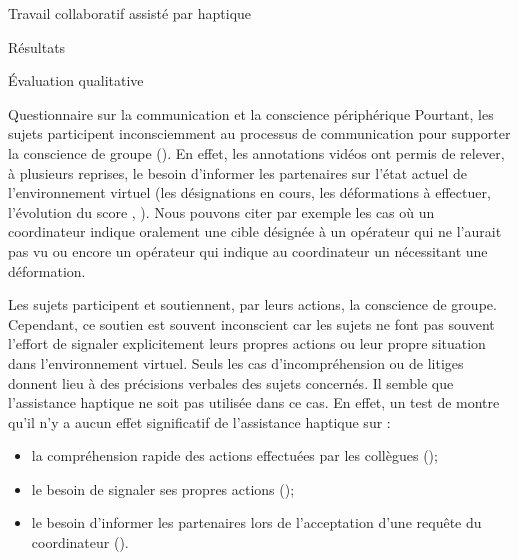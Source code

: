 \documentclass[myfrancais,ngerman,english,french]{mythesis}
\begin{document}
\begin{mychapter}{Travail collaboratif assisté par haptique}
\begin{mysection}{Résultats}
\begin{mysubsection}{Évaluation qualitative}
\begin{mysubsubsection}{Questionnaire sur la communication et la conscience périphérique}
					Pourtant, les sujets participent inconsciemment au processus de communication pour supporter la conscience de groupe ().
					En effet, les annotations vidéos ont permis de relever, à plusieurs reprises, le besoin d'informer les partenaires sur l'état actuel de l'environnement virtuel (les désignations en cours, les déformations à effectuer, l'évolution du score , \myetc).
					Nous pouvons citer par exemple les cas où un coordinateur indique oralement une cible désignée à un opérateur qui ne l'aurait pas vu ou encore un opérateur qui indique au coordinateur un  nécessitant une déformation.

					Les sujets participent et soutiennent, par leurs actions, la conscience de groupe.
					Cependant, ce soutien est souvent inconscient car les sujets ne font pas souvent l'effort de signaler explicitement leurs propres actions ou leur propre situation dans l'environnement virtuel.
					Seuls les cas d'incompréhension ou de litiges donnent lieu à des précisions verbales des sujets concernés.
					Il semble que l'assistance haptique ne soit pas utilisée dans ce cas.
					En effet, un test de  montre qu'il n'y a aucun effet significatif de l'assistance haptique  sur :
					\begin{itemize}
						\item la compréhension rapide des actions effectuées par les collègues ();
						\item le besoin de signaler ses propres actions ();
						\item le besoin d'informer les partenaires lors de l'acceptation d'une requête du coordinateur ().
					\end{itemize}


\end{mysubsubsection}
\end{mysubsection}
\end{mysection}
\end{mychapter}
\end{document}
